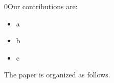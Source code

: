 

0Our contributions are:

\begin{itemize}
 \item a
 \item b 
 \item c
\end{itemize}

The paper is organized as follows. 